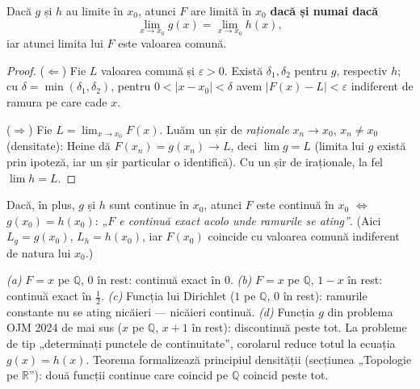 \begin{teorema}
Dacă $g$ și $h$ au limite în $x_0$, atunci $F$ are limită în $x_0$ \textbf{dacă și numai dacă}
\[
\lim_{x\to x_0}g(x)=\lim_{x\to x_0}h(x),
\]
iar atunci limita lui $F$ este valoarea comună.
\end{teorema}
\begin{proof}
($\Leftarrow$) Fie $L$ valoarea comună și $\varepsilon>0$. Există $\delta_1,\delta_2$ pentru $g$, respectiv $h$; cu $\delta=\min(\delta_1,\delta_2)$, pentru $0<|x-x_0|<\delta$ avem $|F(x)-L|<\varepsilon$ indiferent de ramura pe care cade $x$.

($\Rightarrow$) Fie $L=\lim_{x\to x_0}F(x)$. Luăm un șir de \emph{raționale} $x_n\to x_0$, $x_n\neq x_0$ (densitate): Heine dă $F(x_n)=g(x_n)\to L$, deci $\lim g=L$ (limita lui $g$ există prin ipoteză, iar un șir particular o identifică). Cu un șir de iraționale, la fel $\lim h=L$.
\end{proof}

\begin{corolar}
Dacă, în plus, $g$ și $h$ sunt continue în $x_0$, atunci $F$ este continuă în $x_0$ $\iff$ $g(x_0)=h(x_0)$: \emph{„$F$ e continuă exact acolo unde ramurile se ating''}. (Aici $L_g=g(x_0)$, $L_h=h(x_0)$, iar $F(x_0)$ coincide cu valoarea comună indiferent de natura lui $x_0$.)
\end{corolar}

\begin{obs}
\emph{(a)} $F=x$ pe $\mathbb{Q}$, $0$ în rest: continuă exact în $0$. \emph{(b)} $F=x$ pe $\mathbb{Q}$, $1-x$ în rest: continuă exact în $\frac12$. \emph{(c)} Funcția lui Dirichlet ($1$ pe $\mathbb{Q}$, $0$ în rest): ramurile constante nu se ating nicăieri --- nicăieri continuă. \emph{(d)} Funcția $g$ din problema OJM 2024 de mai sus ($x$ pe $\mathbb{Q}$, $x+1$ în rest): discontinuă peste tot. La probleme de tip „determinați punctele de continuitate'', corolarul reduce totul la ecuația $g(x)=h(x)$. Teorema formalizează principiul densității (secțiunea „Topologie pe $\mathbb{R}$''): două funcții continue care coincid pe $\mathbb{Q}$ coincid peste tot.
\end{obs}

